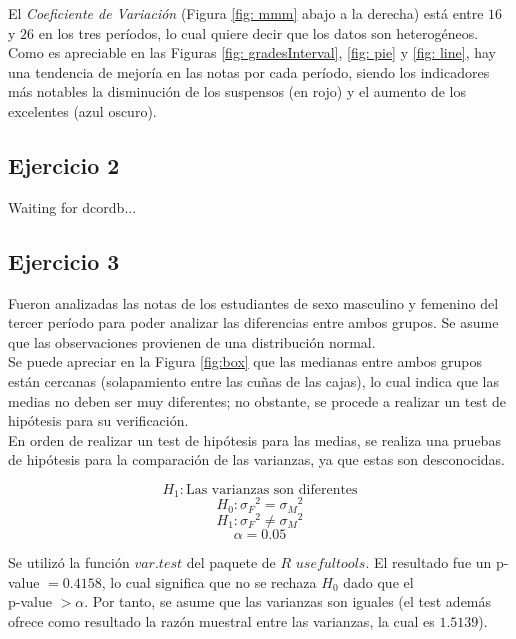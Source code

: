 \documentclass[a4paper,10pt,twocolumn]{article}
\begin{document}
	El \emph{Coeficiente de Variación} (Figura \ref{fig: mmm} abajo a la derecha) está entre $16$ y $26$ en los tres períodos, lo cual quiere decir que los datos son heterogéneos.\\
	
	Como es apreciable en las Figuras \ref{fig: gradesInterval}, \ref{fig: pie} y \ref{fig: line}, hay una tendencia de mejoría en las notas por cada período, siendo los indicadores más notables la disminución de los suspensos (en rojo) y el aumento de los excelentes (azul oscuro). \\
	\subsection{Ejercicio 2}\label{sub:results2}
		Waiting for dcordb...

	\subsection{Ejercicio 3}\label{sub:results3}
	Fueron analizadas las notas de los estudiantes de sexo masculino y femenino del tercer período para poder analizar las diferencias entre ambos grupos. Se asume que las observaciones provienen de una distribución normal. \\
	
	Se puede apreciar en la Figura \ref{fig:box} que las medianas entre ambos grupos están cercanas (solapamiento entre las cuñas de las cajas), lo cual indica que las medias no deben ser muy diferentes; no obstante, se procede a realizar un test de hipótesis para su verificación.\\
	
	En orden de realizar un test de hipótesis para las medias, se realiza una pruebas de hipótesis para la comparación de las varianzas, ya que estas son desconocidas.
	
	$$H_1: \text{Las varianzas son diferentes}$$
	$$H_0: {\sigma_F}^2 = {\sigma_M}^2$$
	$$H_1: {\sigma_F}^2 \neq {\sigma_M}^2$$
	$$\alpha = 0.05$$
	
	Se utilizó la función $var.test$ del paquete de $R$ $usefultools$. El resultado fue un p-value $= 0.4158$, lo cual significa que no se rechaza $H_0$ dado que el \\ p-value $> \alpha$. Por tanto, se asume que las varianzas son iguales (el test además ofrece como resultado la razón muestral entre las varianzas, la cual es $1.5139$).\\
	
\end{document}
